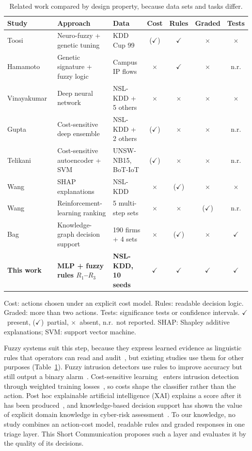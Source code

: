 \documentclass[preprint,12pt]{elsarticle}
\newcommand{\yes}{$\checkmark$}
\newcommand{\prt}{($\checkmark$)}
\newcommand{\no}{$\times$}
\begin{document}
\begin{table}[!t]
\centering
\caption{Related work compared by design property, because data sets and tasks differ.}
\label{tab:rw}
{\scriptsize\setlength{\tabcolsep}{2.5pt}
\begin{tabularx}{\linewidth}{@{}l>{\raggedright\arraybackslash}Xlcccc@{}}
\toprule
Study & Approach & Data & Cost & Rules & Graded & Tests \\
\midrule
Toosi~\cite{toosi2007} & Neuro-fuzzy + genetic tuning & KDD Cup 99 & \prt & \yes & \no & \no \\
Hamamoto~\cite{hamamoto2018} & Genetic signature + fuzzy logic & Campus IP flows & \no & \yes & \no & n.r. \\
Vinayakumar~\cite{vinayakumar2019} & Deep neural network & NSL-KDD + 5 others & \no & \no & \no & \no \\
Gupta~\cite{gupta2022} & Cost-sensitive deep ensemble & NSL-KDD + 2 others & \prt & \no & \no & n.r. \\
Telikani~\cite{telikani2024} & Cost-sensitive autoencoder + SVM & UNSW-NB15, BoT-IoT & \prt & \no & \no & n.r. \\
Wang~\cite{wang2020xai} & SHAP explanations & NSL-KDD & \no & \prt & \no & \no \\
Wang~\cite{wang2024alertpro} & Reinforcement-learning ranking & 5 multi-step sets & \no & \no & \prt & n.r. \\
Bag~\cite{bag2025} & Knowledge-graph decision support & 190 firms + 4 sets & \no & \prt & \no & \yes \\
\midrule
\textbf{This work} & \textbf{MLP + fuzzy rules $R_1$--$R_3$} & \textbf{NSL-KDD, 10 seeds} & \yes & \yes & \yes & \yes \\
\bottomrule
\end{tabularx}}
\par\smallskip
\parbox{\linewidth}{\scriptsize\raggedright Cost: actions chosen under an explicit cost model. Rules: readable decision logic. Graded: more than two actions. Tests: significance tests or confidence intervals. \yes~present, \prt~partial, \no~absent, n.r.~not reported. SHAP: Shapley additive explanations; SVM: support vector machine.}
\end{table}

Fuzzy systems suit this step, because they express learned evidence as linguistic rules that operators can read and audit~\cite{zadeh1965,fernandez2019}, but existing studies use them for other purposes (Table~\ref{tab:rw}). Fuzzy intrusion detectors use rules to improve accuracy but still output a binary alarm~\cite{toosi2007,hamamoto2018,alalhareth2023}. Cost-sensitive learning~\cite{zhou2006} enters intrusion detection through weighted training losses~\cite{gupta2022,telikani2024}, so costs shape the classifier rather than the action. Post hoc explainable artificial intelligence (XAI) explains a score after it has been produced~\cite{arrieta2020,wang2020xai,alabbadi2025}, and knowledge-based decision support has shown the value of explicit domain knowledge in cyber-risk assessment~\cite{bag2025}. To our knowledge, no study combines an action-cost model, readable rules and graded responses in one triage layer. This Short Communication proposes such a layer and evaluates it by the quality of its decisions.
\end{document}
